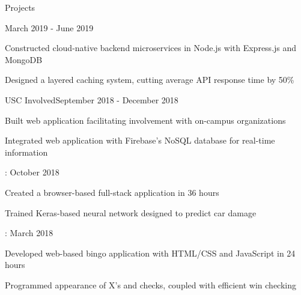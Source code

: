 \documentclass{resume} %
\begin{document}
\begin{rSection}{Projects}

    \begin{rSubsection}{\thediningapp}{March 2019 - June 2019}{}{}
\item Constructed cloud-native backend microservices in Node.js with Express.js
    and MongoDB
\item Designed a layered caching system, cutting average API response time by
    50\%
\end{rSubsection}


\begin{rSubsection}{USC Involved}{September 2018 - December 2018}{}{}
\item Built web application facilitating involvement with on-campus 
    organizations
\item Integrated web application with Firebase’s NoSQL database for real-time
    information
\end{rSubsection}


\begin{rSubsection}{\sdhacks: \motopanion}{October 2018}{}{}
\item Created a browser-based full-stack application in 36 hours
\item Trained Keras-based neural network designed to predict car damage
\end{rSubsection}


\begin{rSubsection}{\trojanhacks: \uscbingo}{March 2018}{}{}
\item Developed web-based bingo application with HTML/CSS and JavaScript in 24 
    hours
\item Programmed appearance of X’s and checks, coupled with efficient win 
    checking 
\end{rSubsection}

\end{rSection}

\end{document}
